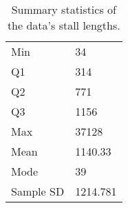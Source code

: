 \begin{table}
    \caption{\label{tab:stall-n} Summary statistics of the data's stall lengths.}
    \begin{tabular}{|l|l|}
        \hline
Min & 34\\
	    Q1 & 314\\

Q2 & 771\\
	    Q3 & 1156\\
Max & 37128\\
\hline
Mean & 1140.33\\
	    Mode & 39\\
Sample SD & 1214.781\\
	\hline
    \end{tabular}
\end{table}
